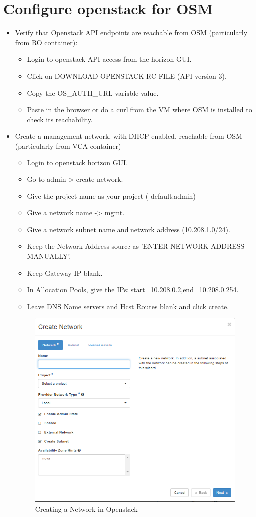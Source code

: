 \section{Configure openstack for OSM}
\begin{itemize}

\item Verify that Openstack API endpoints are reachable from OSM (particularly from RO container):
\begin{itemize}
\item Login to openstack  API access from the horizon GUI.
\item Click on DOWNLOAD OPENSTACK RC FILE (API version 3).
\item Copy the OS\_AUTH\_URL variable value.
\item Paste in the browser or do a curl from the VM where OSM is installed to check its reachability. 
\end{itemize}

\item Create a management network, with DHCP enabled, reachable from OSM (particularly from VCA container)
\begin{itemize}
\item Login to openstack horizon GUI.
\item Go to admin-> create network.
\item Give the project name as your project ( default:admin)
\item Give a network name -> mgmt.
\item Give a network subnet name and network address (10.208.1.0/24). 
\item Keep the Network Address source as 'ENTER NETWORK ADDRESS MANUALLY'.
\item Keep Gateway IP blank.
\item In Allocation Pools, give the IPs:  start=10.208.0.2,end=10.208.0.254.
\item Leave DNS Name servers and Host Routes blank and click create.
\end{itemize}
\begin{figure}[h]
	\centering
	\includegraphics[width=0.4\linewidth]{figures/sh11}
	\caption{Creating a Network in Openstack}
\end{figure} 


\end{itemize}
